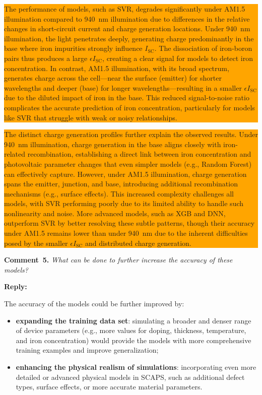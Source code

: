 \documentclass[a4paper,fleqn]{cas-sc}
\begin{document}
\colorbox{orange}{\parbox{\linewidth}{The performance of models, such as SVR, degrades significantly under AM1.5 illumination compared to 940~nm illumination due to differences in the relative changes in short-circuit current and charge generation locations. 
Under 940~nm illumination, the light penetrates deeply, generating charge predominantly in the base where iron impurities strongly influence $I_\mathrm{SC}$. 
The dissociation of iron-boron pairs thus produces a large $\epsilon I_\mathrm{SC}$, creating a clear signal for models to detect iron concentration. 
In contrast, AM1.5 illumination, with its broad spectrum, generates charge across the cell—near the surface (emitter) for shorter wavelengths and deeper (base) for longer wavelengths—resulting in a smaller $\epsilon I_\mathrm{SC}$ due to the diluted impact of iron in the base. 
This reduced signal-to-noise ratio complicates the accurate prediction of iron concentration, particularly for models like SVR that struggle with weak or noisy relationships.}}

\colorbox{orange}{\parbox{\linewidth}{The distinct charge generation profiles further explain the observed results. 
Under 940~nm illumination, charge generation in the base aligns closely with iron-related recombination, establishing a direct link between iron concentration and photovoltaic parameter changes that even simpler models (e.g., Random Forest) can effectively capture. 
However, under AM1.5 illumination, charge generation spans the emitter, junction, and base, introducing additional recombination mechanisms (e.g., surface effects). 
This increased complexity challenges all models, with SVR performing poorly due to its limited ability to handle such nonlinearity and noise. 
More advanced models, such as XGB and DNN, outperform SVR by better resolving these subtle patterns, though their accuracy under AM1.5 remains lower than under 940~nm due to the inherent difficulties posed by the smaller $\epsilon I_\mathrm{SC}$ and distributed charge generation.}}

\vspace{1cm}
\noindent
\textcolor[rgb]{0.00,0.50,1.00}{\textbf{Comment~5.}}
\emph{What can be done to further increase the accuracy of these models?}

\noindent
\textcolor[rgb]{0.51,0.00,0.00}{\textbf{Reply:}}

The accuracy of the models could be further improved by:
\begin{itemize}
    \item \textbf{expanding the training data set}: simulating a broader and denser range of device parameters (e.g., more values for doping, thickness, temperature, and iron concentration) would provide the models with more comprehensive training examples and improve generalization;
    \item \textbf{enhancing the physical realism of simulations}: incorporating even more detailed or advanced physical models in SCAPS, such as additional defect types, surface effects, or more accurate material parameters.
\end{itemize}
\end{document}
